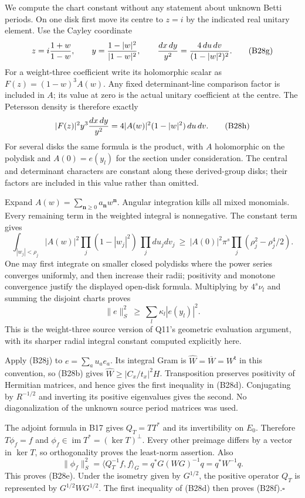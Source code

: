 We compute the chart constant without any statement about
unknown Betti periods.  On one disk first move its centre to
$z=i$ by the indicated real unitary element.  Use the Cayley
coordinate
\[
 z=i{1+w\over1-w},\qquad
 y={1-|w|^2\over|1-w|^2},\qquad
 {dx\,dy\over y^2}={4\,du\,dv\over(1-|w|^2)^2}.
 \tag{B28g}
\]
For a weight-three coefficient write its holomorphic scalar
as $F(z)=(1-w)^3A(w)$.  Any fixed determinant-line comparison
factor is included in $A$; its value at zero is the actual
unitary coefficient at the centre.  The Petersson density is
therefore exactly
\[
       |F(z)|^2y^3{dx\,dy\over y^2}
               =4|A(w)|^2(1-|w|^2)\,du\,dv.
 \tag{B28h}
\]
For several disks the same formula is the product, with
$A$ holomorphic on the polydisk and $A(0)=e(y_l)$ for the
section under consideration.  The central and determinant
characters are constant along these derived-group disks;
their factors are included in this value rather than omitted.

Expand $A(w)=\sum_{\mathbf n\geq0}a_{\mathbf n}w^{\mathbf n}$.
Angular integration kills all mixed monomials.  Every
remaining term in the weighted integral is nonnegative.
The constant term gives
\[
 \int_{|w_j|<\rho_j}|A(w)|^2
                \prod_j(1-|w_j|^2)\,\prod_jdu_jdv_j
 \ \geq\ |A(0)|^2\pi^s
                  \prod_j(\rho_j^2-\rho_j^4/2).
 \tag{B28i}
\]
One may first integrate on smaller closed polydisks where
the power series converges uniformly, and then increase
their radii; positivity and monotone convergence justify
the displayed open-disk formula.  Multiplying by $4^s\nu_l$
and summing the disjoint charts proves
\[
       \|e\|_S^2\ \geq\ \sum_l\kappa_l|e(y_l)|^2.
 \tag{B28j}
\]
This is the weight-three source version of Q11's geometric
evaluation argument, with its sharper radial integral
constant computed explicitly here.

Apply (B28j) to $e=\sum_a u_ae_a$.  Its integral Gram is
$\widehat W=\overline W=W^{\mathsf t}$ in this convention,
so (B28b) gives
$\widehat W\geq|C_x/t_x|^2H$.
Transposition preserves positivity of Hermitian matrices,
and hence gives the first inequality in (B28d).  Conjugating
by $R^{-1/2}$ and inverting its positive eigenvalues gives
the second.  No diagonalization of the unknown source
period matrices was used.

The adjoint formula in B17 gives $Q_T=TT^*$ and its
invertibility on $E_0$.  Therefore $T\phi_f=f$ and
$\phi_f\in\operatorname{im}T^*=(\ker T)^\perp$.
Every other preimage differs by a vector in $\ker T$,
so orthogonality proves the least-norm assertion.  Also
\[
 \|\phi_f\|_S^2
   =\langle Q_T^{-1}f,f\rangle_G
   =q^*G(WG)^{-1}q=q^*W^{-1}q.
\]
This proves (B28e).  Under the isometry given by $G^{1/2}$,
the positive operator $Q_T$ is represented by
$G^{1/2}WG^{1/2}$.  The first inequality of (B28d)
then proves (B28f).\hfill$\square$


